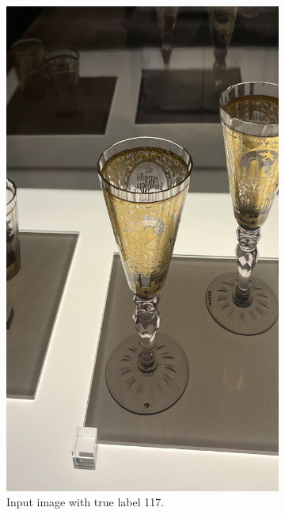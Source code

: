 \begin{figure}[h]
    \centering

    \begin{subfigure}[b]{0.4\textwidth}
        \centering
        \includegraphics[width=\textwidth]{img/117.jpg}
        \caption{Input image with true label 117.}
    \end{subfigure}
    \hfill
    \begin{subfigure}[b]{0.4\textwidth}
        \centering

\end{subfigure}
\end{figure}

